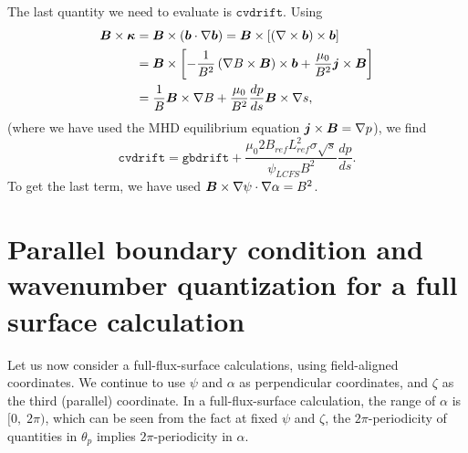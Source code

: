 \documentclass[11pt,letter]{article}
\newcommand{\vect}[1]{\mbox{\boldmath $#1$}}
\newcommand{\gbdrift}{\mathtt{gbdrift}}
\newcommand{\cvdrift}{\mathtt{cvdrift}}
\begin{document}
The last quantity we need to evaluate is $\cvdrift$. Using
\begin{align}
\vect{B}\times\vect{\kappa}
&= \vect{B}\times(\vect{b}\cdot\nabla \vect{b}) 
= \vect{B}\times \left[ (\nabla\times\vect{b}) \times\vect{b}\right] \nonumber \\
&= \vect{B} \times \left[ -\frac{1}{B^2} \left( \nabla B \times\vect{B}\right)\times\vect{b} + \frac{\mu_0}{B^2} \vect{j}\times\vect{B}\right] \nonumber \\
&= \frac{1}{B} \vect{B}\times\nabla B + \frac{\mu_0}{B^2} \frac{dp}{ds} \vect{B}\times\nabla s,
\end{align}
(where we have used the MHD equilibrium equation $\vect{j}\times\vect{B} = \nabla p$), we find
\begin{equation}
\cvdrift = \gbdrift 
+ \frac{\mu_0 2 B_{ref} L_{ref}^2 \sigma \sqrt{s}}{\psi_{LCFS} B^2} \frac{dp}{ds}.
\end{equation}
To get the last term, we have used $\vect{B}\times\nabla \psi \cdot \nabla \alpha = B^2$. %




\section{Parallel boundary condition and wavenumber quantization for a full surface calculation}

Let us now consider a full-flux-surface calculations, using field-aligned coordinates. 
We continue to use $\psi$ and $\alpha$ as perpendicular coordinates, and $\zeta$ as the third (parallel) coordinate.
In a full-flux-surface calculation, the range of $\alpha$ is $[0,\; 2\pi)$,
which can be seen from the fact at fixed $\psi$ and $\zeta$, the $2\pi$-periodicity of quantities in
$\theta_p$ implies $2\pi$-periodicity in $\alpha$.
\end{document}
